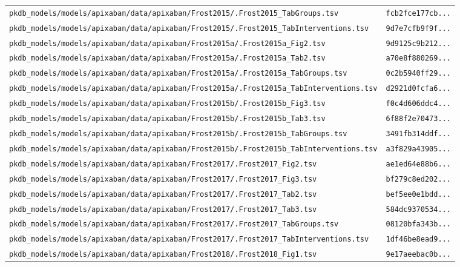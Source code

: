 \begin{longtable}{ll}
\texttt{pkdb\_models/models/apixaban/data/apixaban/Frost2015/.Frost2015\_TabGroups.tsv} & \texttt{fcb2fce177cb...} \\
\texttt{pkdb\_models/models/apixaban/data/apixaban/Frost2015/.Frost2015\_TabInterventions.tsv} & \texttt{9d7e7cfb9f9f...} \\
\texttt{pkdb\_models/models/apixaban/data/apixaban/Frost2015a/.Frost2015a\_Fig2.tsv} & \texttt{9d9125c9b212...} \\
\texttt{pkdb\_models/models/apixaban/data/apixaban/Frost2015a/.Frost2015a\_Tab2.tsv} & \texttt{a70e8f880269...} \\
\texttt{pkdb\_models/models/apixaban/data/apixaban/Frost2015a/.Frost2015a\_TabGroups.tsv} & \texttt{0c2b5940ff29...} \\
\texttt{pkdb\_models/models/apixaban/data/apixaban/Frost2015a/.Frost2015a\_TabInterventions.tsv} & \texttt{d2921d0fcfa6...} \\
\texttt{pkdb\_models/models/apixaban/data/apixaban/Frost2015b/.Frost2015b\_Fig3.tsv} & \texttt{f0c4d606ddc4...} \\
\texttt{pkdb\_models/models/apixaban/data/apixaban/Frost2015b/.Frost2015b\_Tab3.tsv} & \texttt{6f88f2e70473...} \\
\texttt{pkdb\_models/models/apixaban/data/apixaban/Frost2015b/.Frost2015b\_TabGroups.tsv} & \texttt{3491fb314ddf...} \\
\texttt{pkdb\_models/models/apixaban/data/apixaban/Frost2015b/.Frost2015b\_TabInterventions.tsv} & \texttt{a3f829a43905...} \\
\texttt{pkdb\_models/models/apixaban/data/apixaban/Frost2017/.Frost2017\_Fig2.tsv} & \texttt{ae1ed64e88b6...} \\
\texttt{pkdb\_models/models/apixaban/data/apixaban/Frost2017/.Frost2017\_Fig3.tsv} & \texttt{bf279c8ed202...} \\
\texttt{pkdb\_models/models/apixaban/data/apixaban/Frost2017/.Frost2017\_Tab2.tsv} & \texttt{bef5ee0e1bdd...} \\
\texttt{pkdb\_models/models/apixaban/data/apixaban/Frost2017/.Frost2017\_Tab3.tsv} & \texttt{584dc9370534...} \\
\texttt{pkdb\_models/models/apixaban/data/apixaban/Frost2017/.Frost2017\_TabGroups.tsv} & \texttt{08120bfa343b...} \\
\texttt{pkdb\_models/models/apixaban/data/apixaban/Frost2017/.Frost2017\_TabInterventions.tsv} & \texttt{1df46be8ead9...} \\
\texttt{pkdb\_models/models/apixaban/data/apixaban/Frost2018/.Frost2018\_Fig1.tsv} & \texttt{9e17aeebac0b...} \\

\end{longtable}
